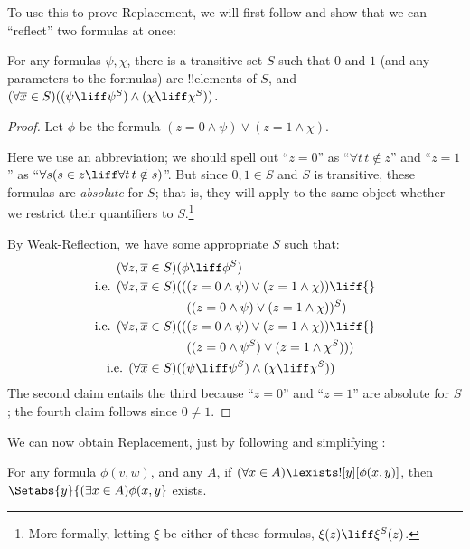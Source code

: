 \documentclass[../../../include/open-logic-section]{subfiles}
\begin{document}
To use this to prove Replacement, we will first follow \citet[first
part of Theorem 2]{Levy1960} and show that we can ``reflect'' two
formulas at once:

\begin{lem}
For any formulas $\psi, \chi$, there is a transitive set $S$ such that
$0$ and $1$ (and any parameters to the formulas) are !!{element}s of
$S$, and $(\forall \overline{x} \in S)((\psi \liff \psi^S) \land (\chi
\liff \chi^S))$.
\end{lem}

\begin{proof}
Let $\phi$ be the formula $(z = 0 \land \psi) \lor (z = 1 \land \chi)$. 

Here we use an abbreviation; we should spell out ``$z = 0$'' as
``$\forall t\, t \notin z$'' and ``$z =1$'' as ``$\forall s(s \in z
\liff \forall t\, t \notin s)$''. But since $0, 1 \in S$ and $S$ is
transitive, these formulas are \emph{absolute} for $S$; that is, they
will apply to the same object whether we restrict their quantifiers to
$S$.\footnote{More formally, letting $\xi$ be either of these
formulas, $\xi(z) \liff \xi^S(z)$.}

By Weak-Reflection, we have some appropriate $S$ such that:
\begin{align*}
	(\forall z, \overline{x} \in S)(&\phi \liff \phi^S)\\
	\text{i.e. }(\forall z, \overline{x} \in S)(&((z = 0 \land \psi) \lor (z = 1 \land \chi)) \liff {}\\
	&\phantom{(}((z = 0 \land \psi) \lor (z = 1 \land \chi))^S)\\
	\text{i.e. }(\forall z, \overline{x} \in S)(&((z = 0 \land \psi) \lor (z = 1 \land \chi))\liff {}\\
	&\phantom{(}((z = 0 \land \psi^S) \lor (z = 1 \land \chi^S)))\\
	\text{i.e. }(\forall \overline{x} \in S)(&(\psi \liff \psi^S) \land (\chi \liff \chi^S))
\end{align*}
The second claim entails the third because ``$z = 0$'' and ``$z=1$''
are absolute for $S$; the fourth claim follows since $0 \neq 1$.
\end{proof}\noindent We can now obtain Replacement, just by following and simplifying 
\citet[Theorem 6]{Levy1960}:

\begin{thm}\label{thm:replacement} 
For any formula $\phi(v,w)$, and any $A$, if $(\forall x \in A)\lexists![y][\phi(x,y)]$, then
$\Setabs{y}{(\exists x \in A)\phi(x,y}$ exists.
\end{thm}
\end{document}

